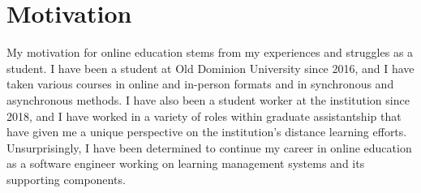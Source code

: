 \chapter{Motivation}
\label{ch:motivation}


My motivation for online education stems from my experiences and struggles as a student. I have been a student at Old Dominion University since 2016, and I have taken various courses in online and in-person formats and in synchronous and asynchronous methods. I have also been a student worker at the institution since 2018, and I have worked in a variety of roles within graduate assistantship that have given me a unique perspective on the institution's distance learning efforts. Unsurprisingly, I have been determined to continue my career in online education as a software engineer working on learning management systems and its supporting components.